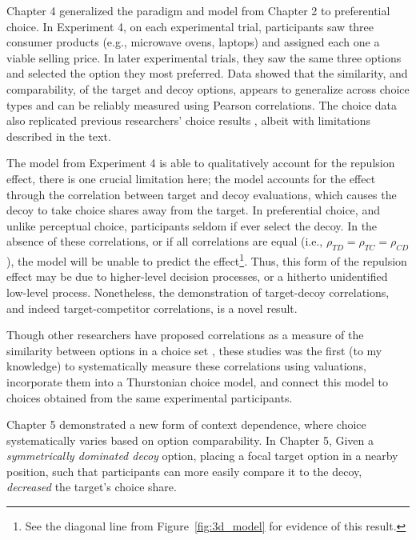 Chapter 4 generalized the paradigm and model from Chapter 2 to preferential choice. In Experiment 4, on each experimental trial, participants saw three consumer products (e.g., microwave ovens, laptops) and assigned each one a viable selling price. In later experimental trials, they saw the same three options and selected the option they most preferred. Data showed that the similarity, and comparability, of the target and decoy options, appears to generalize across choice types and can be reliably measured using Pearson correlations. The choice data also replicated previous researchers' choice results \parencite{banerjeeFactorsThatPromote2024}, albeit with limitations described in the text.

The model from Experiment 4 is able to qualitatively account for the repulsion effect, there is one crucial limitation here; the model accounts for the effect through the correlation between target and decoy evaluations, which causes the decoy to take choice shares away from the target. In preferential choice, and unlike perceptual choice, participants seldom if ever select the decoy. In the absence of these correlations, or if all correlations are equal (i.e., $\rho_{TD}=\rho_{TC}=\rho_{CD}$), the model will be unable to predict the effect\footnote{See the diagonal line from Figure~\ref{fig:3d_model} for evidence of this result.}. Thus, this form of the repulsion effect may be due to higher-level decision processes, or a hitherto unidentified low-level process. Nonetheless, the demonstration of target-decoy correlations, and indeed target-competitor correlations, is a novel result. 

Though other researchers have proposed correlations as a measure of the similarity between options in a choice set \parencite{kamakura1984predicting,natenzon2019random}, these studies was the first (to my knowledge) to systematically measure these correlations using valuations, incorporate them into a Thurstonian choice model, and connect this model to choices obtained from the same experimental participants.

Chapter 5 demonstrated a new form of context dependence, where choice systematically varies based on option comparability. In Chapter 5, Given a \textit{symmetrically dominated decoy} option, placing a focal target option in a nearby position, such that participants can more easily compare it to the decoy, \textit{decreased} the target's choice share. 

